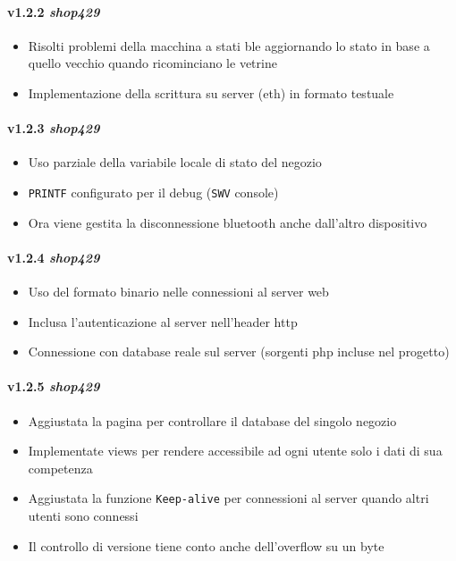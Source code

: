 \paragraph{v1.2.2 \textit{shop429}}
	\begin{itemize}
		\item Risolti problemi della macchina a stati ble aggiornando lo stato in base a quello vecchio quando ricominciano le vetrine
		\item Implementazione della scrittura su server (eth) in formato testuale
	\end{itemize}
\paragraph{v1.2.3 \textit{shop429}}
	\begin{itemize}
		\item Uso parziale della variabile locale di stato del negozio
    \item \texttt{PRINTF} configurato per il debug (\texttt{SWV} console)
		\item Ora viene gestita la disconnessione bluetooth anche dall'altro dispositivo
	\end{itemize}
\paragraph{v1.2.4 \textit{shop429}}
	\begin{itemize}
		\item Uso del formato binario nelle connessioni al server web
		\item Inclusa l'autenticazione al server nell'header http
		\item Connessione con database reale sul server (sorgenti php incluse nel progetto)
	\end{itemize}
\paragraph{v1.2.5 \textit{shop429}}
  \begin{itemize}
  	\item Aggiustata la pagina per controllare il database del singolo negozio
    \item Implementate views per rendere accessibile ad ogni utente solo i dati di sua competenza
    \item Aggiustata la funzione \texttt{Keep-alive} per connessioni al server quando altri utenti sono connessi
    \item Il controllo di versione tiene conto anche dell'overflow su un byte
  \end{itemize}
